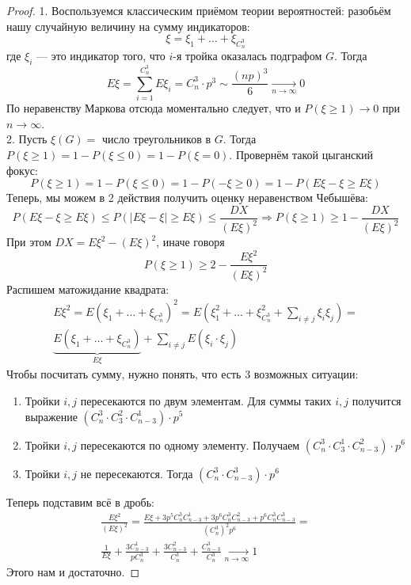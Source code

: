 \begin{proof}
	1. Воспользуемся классическим приёмом теории вероятностей: разобьём нашу случайную величину на сумму индикаторов:
	\[
		\xi = \xi_1 + \dots + \xi_{C_n^3}
	\]
	где $\xi_i$ --- это индикатор того, что $i$-я тройка оказалась подграфом $G$. Тогда
	\[
		E\xi = \sum_{i = 1}^{C_n^3} E \xi_i = C_n^3 \cdot p^3 \sim \frac{(np)^3}{6} \xrightarrow[n \to \infty]{} 0
	\]
	По неравенству Маркова отсюда моментально следует, что и $P(\xi \ge 1) \to 0$ при $n \to \infty$.\\
    2. Пусть $\xi(G) = $ число треугольников в $G$. Тогда $P(\xi \ge 1) = 1 - P(\xi \le 0) = 1 - P(\xi = 0)$.  Провернём такой цыганский фокус:
	\[
		P(\xi \ge 1) = 1 - P(\xi \le 0) = 1 - P(-\xi \ge 0) = 1 - P(E \xi - \xi \ge E \xi)
	\]
	Теперь, мы можем в 2 действия получить оценку неравенством Чебышёва:
	\[
		P(E \xi - \xi \ge E \xi) \le P(|E \xi - \xi| \ge E \xi) \le \frac{DX}{(E \xi)^2} \Longrightarrow P(\xi \ge 1) \ge 1 - \frac{DX}{(E \xi)^2}
	\]
	При этом $DX = E \xi^2 - (E \xi)^2$, иначе говоря
	\[
		P(\xi \ge 1) \ge 2 - \frac{E \xi^2}{(E \xi)^2}
	\]
	Распишем матожидание квадрата:
	\begin{multline*}
		E \xi^2 = E (\xi_1 + \dots + \xi_{C_n^3})^2 = E({\xi_1^2 + \dots + \xi_{C_n^3}^2 + \sum_{i \neq j} \xi_i \xi_j}) =
		\\
		\underbrace{E(\xi_1 + \ldots + \xi_{C_n^3})}_{E \xi} + \sum_{i \neq j} E(\xi_i \cdot \xi_j)
	\end{multline*}
	Чтобы посчитать сумму, нужно понять, что есть 3 возможных ситуации:
	\begin{enumerate}
		\item Тройки $i, j$ пересекаются по двум элементам. Для суммы таких $i, j$ получится выражение $(C_n^3 \cdot C_3^2 \cdot C_{n - 3}^1) \cdot p^5$
		
		\item Тройки $i, j$ пересекаются по одному элементу. Получаем $(C_n^3 \cdot C_3^1 \cdot C_{n - 3}^2) \cdot p^6$
		
		\item Тройки $i, j$ не пересекаются. Тогда $(C_n^3 \cdot C_{n - 3}^3) \cdot p^6$
	\end{enumerate}
	Теперь подставим всё в дробь:
	\begin{multline*}
		\frac{E \xi^2}{(E \xi)^2} = \frac{E \xi + 3p^5 C_n^3 C_{n - 3}^1 + 3p^6 C_n^3 C_{n - 3}^2 + p^6 C_n^3 C_{n - 3}^3}{(C_n^3)^2 p^6} =
		\\
		\frac{1}{E \xi} + \frac{3C_{n - 3}^1}{pC_n^3} + \frac{3C_{n - 3}^2}{C_n^3} + \frac{C_{n - 3}^3}{C_n^3} \xrightarrow[n \to \infty]{} 1
	\end{multline*}
	Этого нам и достаточно.
\end{proof}

